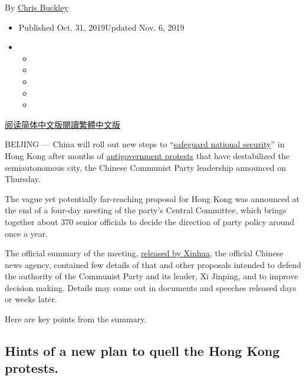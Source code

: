 By \href{https://www.nytimes3xbfgragh.onion/by/chris-buckley}{Chris
Buckley}

\begin{itemize}
\item
  Published Oct. 31, 2019Updated Nov. 6, 2019
\item
  \begin{itemize}
  \item
  \item
  \item
  \item
  \item
  \end{itemize}
\end{itemize}

\href{https://cn.nytimes3xbfgragh.onion/china/20191101/hong-kong-protests-china/}{阅读简体中文版}\href{https://cn.nytimes3xbfgragh.onion/china/20191101/hong-kong-protests-china/zh-hant/}{閱讀繁體中文版}

BEIJING --- China will roll out new steps to
``\href{https://www.nytimes3xbfgragh.onion/2019/11/06/world/asia/hong-kong-protests-china-national-security.html}{safeguard
national security}'' in Hong Kong after months of
\href{https://www.nytimes3xbfgragh.onion/2019/10/31/world/asia/hong-kong-halloween.html}{antigovernment
protests} that have destabilized the semiautonomous city, the Chinese
Communist Party leadership announced on Thursday.

The vague yet potentially far-reaching proposal for Hong Kong was
announced at the end of a four-day meeting of the party's Central
Committee, which brings together about 370 senior officials to decide
the direction of party policy around once a year.

The official summary of the meeting,
\href{http://www.chinanews.com/gn/2019/10-31/8994802.shtml}{released by
Xinhua}, the official Chinese news agency, contained few details of that
and other proposals intended to defend the authority of the Communist
Party and its leader, Xi Jinping, and to improve decision making.
Details may come out in documents and speeches released days or weeks
later.

Here are key points from the summary.

\hypertarget{hints-of-a-new-plan-to-quell-the-hong-kong-protests}{%
\subsection{Hints of a new plan to quell the Hong Kong
protests.}\label{hints-of-a-new-plan-to-quell-the-hong-kong-protests}}

